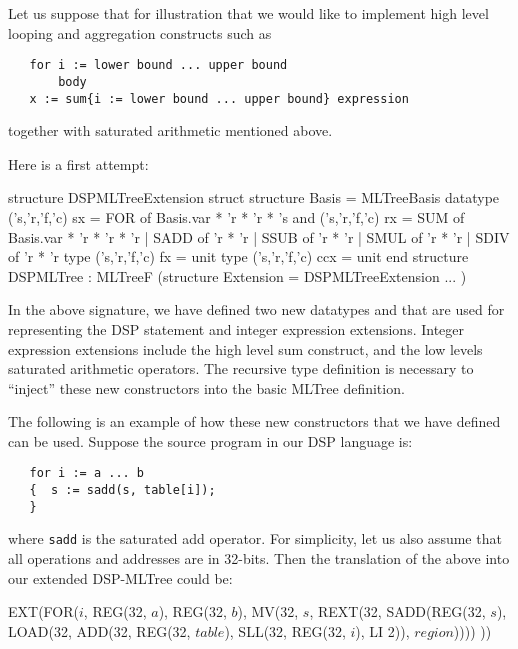 Let us suppose that for illustration that we would like to
implement high level looping and aggregation constructs such as
\begin{verbatim}
   for i := lower bound ... upper bound
       body
   x := sum{i := lower bound ... upper bound} expression
\end{verbatim}
together with saturated arithmetic mentioned above.

Here is a first attempt:
\begin{SML}
structure DSPMLTreeExtension
struct
   structure Basis = MLTreeBasis
   datatype ('s,'r,'f,'c) sx = 
      FOR of Basis.var * 'r * 'r * 's
   and ('s,'r,'f,'c) rx = 
      SUM of Basis.var * 'r * 'r * 'r
    | SADD of 'r * 'r
    | SSUB of 'r * 'r
    | SMUL of 'r * 'r
    | SDIV of 'r * 'r
   type ('s,'r,'f,'c) fx = unit
   type ('s,'r,'f,'c) ccx = unit
end
structure DSPMLTree : MLTreeF
    (structure Extension = DSPMLTreeExtension
     ...
    )
\end{SML}
In the above signature, we have defined two new datatypes 
and  that are used for representing the DSP statement
and integer expression extensions.  Integer expression extensions
include the high level sum construct, and the low levels saturated
arithmetic operators.  The recursive type definition is
necessary to ``inject'' these new constructors into the basic MLTree 
definition.

The following is an example of how these new constructors that we have defined can be used.  Suppose the source program in our DSP language is:
\begin{verbatim}
   for i := a ... b
   {  s := sadd(s, table[i]);
   }
\end{verbatim}
\noindent where \verb|sadd| is the saturated add operator.
For simplicity, let us also assume that all operations and addresses
are in 32-bits.
Then the translation of the above into our extended DSP-MLTree could be:
\begin{SML}
   EXT(FOR(\(i\), REG(32, \(a\)), REG(32, \(b\)),
           MV(32, \(s\), REXT(32, SADD(REG(32, \(s\)), 
                LOAD(32, 
                    ADD(32, REG(32, \(table\)), 
                        SLL(32, REG(32, \(i\)), LI 2)),
                         \(region\)))))
          ))
\end{SML}

